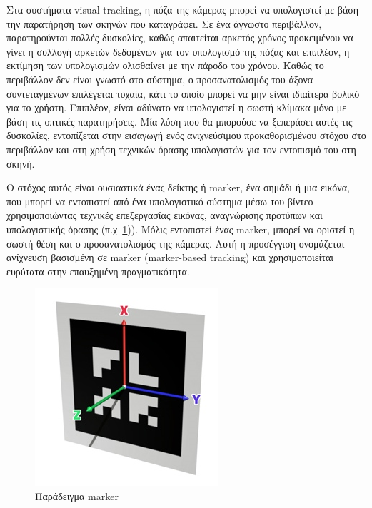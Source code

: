 Στα συστήματα visual tracking, η πόζα της κάμερας μπορεί να υπολογιστεί με βάση την παρατήρηση των σκηνών που καταγράφει. Σε ένα άγνωστο περιβάλλον, παρατηρούνται πολλές δυσκολίες, καθώς απαιτείται αρκετός χρόνος προκειμένου να γίνει η συλλογή αρκετών δεδομένων για τον υπολογισμό της πόζας και επιπλέον, η εκτίμηση των υπολογισμών ολισθαίνει με την πάροδο του χρόνου. Καθώς το περιβάλλον δεν είναι γνωστό στο σύστημα, ο προσανατολισμός του άξονα συντεταγμένων επιλέγεται τυχαία, κάτι το οποίο μπορεί να μην είναι ιδιαίτερα βολικό για το χρήστη. Επιπλέον, είναι αδύνατο να υπολογιστεί η σωστή κλίμακα μόνο με βάση τις οπτικές παρατηρήσεις. Μία λύση που θα μπορούσε να ξεπεράσει αυτές τις δυσκολίες, εντοπίζεται στην εισαγωγή ενός ανιχνεύσιμου προκαθορισμένου στόχου στο περιβάλλον και στη χρήση τεχνικών όρασης υπολογιστών για τον εντοπισμό του στη σκηνή. 

Ο στόχος αυτός είναι ουσιαστικά ένας δείκτης ή marker, ένα σημάδι ή μια εικόνα, που μπορεί να εντοπιστεί από ένα υπολογιστικό σύστημα μέσω του βίντεο χρησιμοποιώντας τεχνικές επεξεργασίας εικόνας, αναγνώρισης προτύπων και υπολογιστικής όρασης (π.χ~\ref{fig:marker})). Μόλις εντοπιστεί ένας marker, μπορεί να οριστεί η σωστή θέση και ο προσανατολισμός της κάμερας. Αυτή η προσέγγιση ονομάζεται ανίχνευση βασισμένη σε marker (marker-based tracking) και χρησιμοποιείται ευρύτατα στην επαυξημένη πραγματικότητα.%

\begin{figure}[H]
    \centering
    \includegraphics[scale=0.6, angle=0]{Files/Figures/marker-axis.jpg}
    \caption[Παράδειγμα marker]{ Παράδειγμα marker}
    \label{fig:marker}
\end{figure}




